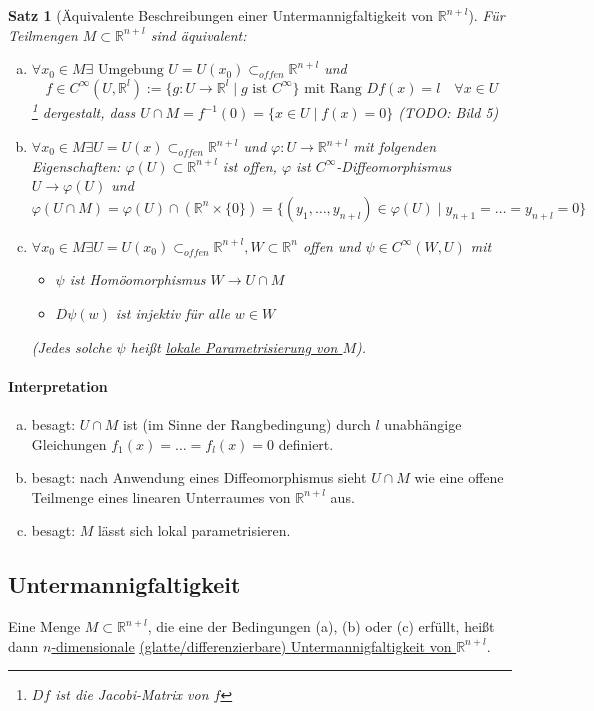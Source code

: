 \documentclass[a4paper,11pt,notitlepage]{report}
\newtheorem{theorem}{Satz}[chapter]
\newcommand{\R}{{\ensuremath{\mathbb{R}}}}
\newenvironment{Kasten}[1]
{
\hspace{0.05\linewidth}
\begin{center}
\begin{minipage}{0.9\linewidth}
\setlength{\fboxsep}{10pt}
\definecolor{shadecolor}{gray}{1}
\definecolor{framecolor}{gray}{0}
\def\FrameCommand{\fcolorbox{framecolor}{shadecolor}}
\MakeFramed {\FrameRestore}
\subsection{#1}
\begin{itshape}
}
{
\end{itshape}
\endMakeFramed
\end{minipage}
\end{center}
}
\begin{document}
\begin{theorem}[Äquivalente Beschreibungen einer Untermannigfaltigkeit von $\R^{n+l}$]
	Für Teilmengen $M \subset \R^{n+l}$ sind äquivalent:
	\begin{enumerate}[(a)]
		\item $\forall x_0 \in M \exists \text{ Umgebung } U = U(x_0) \subset_{offen} \R^{n+l}$ und $$f \in C^\infty(U, \R^l) := \{g \colon U \rightarrow \R^l \mid g \text{ ist } C^\infty\}\text{ mit Rang }Df(x) = l \quad \forall x \in U$$ \footnote{$Df$ ist die Jacobi-Matrix von $f$} dergestalt, dass $U \cap M = f^{-1}(0) = \{x \in U \mid f(x) = 0\}$ (TODO: Bild 5)
		\item $\forall x_0 \in M \exists U = U(x) \subset_{offen} \R^{n+l}$ und $\varphi \colon U \rightarrow \R^{n+l}$ mit folgenden Eigenschaften:
		$\varphi(U) \subset \R^{n+l}$ ist offen, $\varphi$ ist $C^\infty$-Diffeomorphismus $U \rightarrow \varphi(U)$ und $$\varphi(U \cap M) = \varphi(U) \cap (\R^n \times \{0\}) = \{(y_1, \ldots, y_{n+l}) \in \varphi(U) \mid y_{n+1} = \ldots = y_{n+l} = 0 \}$$
		\item $\forall x_0 \in M \exists U = U(x_0) \subset_{offen} \R^{n+l}, W \subset \R^n$ offen und $\psi \in C^\infty(W,U)$ mit 
			\begin{itemize}
				\item $\psi$ ist Homöomorphismus $W \rightarrow U \cap M$
				\item $D\psi(w)$ ist injektiv für alle $w \in W$
			\end{itemize}
			(Jedes solche $\psi$ heißt \underline{lokale Parametrisierung von $M$}).
	\end{enumerate}
\end{theorem}

\paragraph{Interpretation}
\begin{enumerate}[(a)]
	\item besagt: $U \cap M$ ist (im Sinne der Rangbedingung) durch $l$ unabhängige Gleichungen $f_1(x) = \ldots = f_l(x) = 0$ definiert.
	\item besagt: nach Anwendung eines Diffeomorphismus sieht $U \cap M$ wie eine offene Teilmenge eines linearen Unterraumes von $\R^{n+l}$ aus.
	\item besagt: $M$ lässt sich lokal parametrisieren.
\end{enumerate}

\begin{Kasten}{Untermannigfaltigkeit}
Eine Menge $M \subset \R^{n+l}$, die eine der Bedingungen (a), (b) oder (c) erfüllt, heißt dann \underline{$n$-dimensionale} \underline{(glatte/differenzierbare) Untermannigfaltigkeit von $\R^{n+l}$}.
\end{Kasten}
\end{document}
